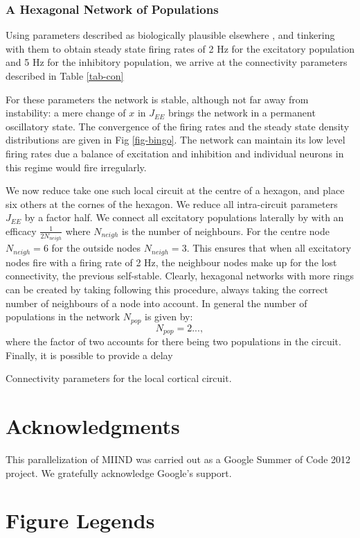 \documentclass[12pt]{article}
\begin{document}
\subsubsection{A Hexagonal Network of Populations}
\label{sec-hexagon}
Using parameters described as biologically plausible elsewhere \citet{amit1997}, and tinkering with them to obtain
steady state firing rates of 2 Hz for the excitatory population and 5 Hz for the inhibitory population, we arrive at the
connectivity parameters described in Table \ref{tab-con}
\begin{table}[h]
\label{tab-con}
For these parameters the network is stable, although not far away from instability: a mere change of $x$ in $J_{EE}$ brings the network
in a permanent oscillatory state. The convergence of the firing rates and the steady state density distributions are given in Fig \ref{fig-bingo}.
The network can maintain its low level firing rates due a balance of excitation and inhibition and individual neurons in this regime
would fire irregularly.


We now reduce take one such local circuit at the centre of a hexagon, and place six others at the cornes of the hexagon. We
reduce all intra-circuit parameters $J_{EE}$ by a factor half. We connect all excitatory populations laterally by with an efficacy
$\frac{1}{2N_{neigh}}$ where $N_{neigh}$ is the number of neighbours. For the centre node $N_{neigh}= 6$ for the outside nodes $N_{neigh} = 3$.
This ensures that when all excitatory nodes fire with a firing rate of 2 Hz, the neighbour nodes make up for the lost connectivity,
the previous self-stable. Clearly, hexagonal networks with more rings can be created by taking following this procedure, always taking
the correct number of neighbours of a node into account. In general the number of populations in the network $N_{pop}$ is given
by:
\begin{equation}
N_{pop} = 2 ...,
\end{equation}
where the factor of two accounts for there being two populations in the circuit. Finally, it is possible to provide a delay
\caption{Connectivity parameters for the local cortical circuit.}
\end{table}
\section*{Acknowledgments}
This parallelization of MIIND was carried out as a Google Summer of Code 2012 project. We gratefully acknowledge Google's support. 




\section*{Figure Legends}
\end{document}
